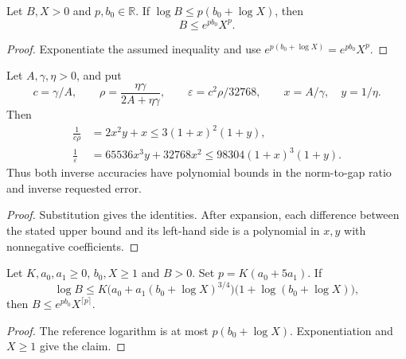 \begin{lemma}
    \label{lem:le_exp_mul_rpow_of_log_le}
    \leanok
    Let $B,X>0$ and $p,b_0\in\mathbb R$. If
    $\log B\le p(b_0+\log X)$, then
    \[
        B\le e^{pb_0}X^p.
    \]
\end{lemma}
\begin{proof}\leanok
    Exponentiate the assumed inequality and use
    $e^{p(b_0+\log X)}=e^{pb_0}X^p$.
\end{proof}

\begin{lemma}
    \label{lem:refinement_cost_polynomial_bounds}
    \leanok
    Let $A,\gamma,\eta>0$, and put
    \[
        c=\gamma/A,\qquad \rho=\frac{\eta\gamma}{2A+\eta\gamma},
        \qquad \varepsilon=c^2\rho/32768,
        \qquad x=A/\gamma,\quad y=1/\eta.
    \]
    Then
    \begin{align*}
        \frac1{c\rho}       & =2x^2y+x
        \le3(1+x)^2(1+y),                         \\
        \frac1{\varepsilon} & =65536x^3y+32768x^2
        \le98304(1+x)^3(1+y).
    \end{align*}
    Thus both inverse accuracies have polynomial bounds in the
    norm-to-gap ratio and inverse requested error.
\end{lemma}
\begin{proof}\leanok
    Substitution gives the identities. After expansion, each difference
    between the stated upper bound and its left-hand side is a polynomial
    in $x,y$ with nonnegative coefficients.
\end{proof}


\begin{lemma}
    \label{lem:reference_bound_le_nat_power}
    \leanok
    Let $K,a_0,a_1\ge0$, $b_0,X\ge1$ and $B>0$. Set
    $p=K(a_0+5a_1)$. If
    \[
        \log B\le K\bigl(a_0+a_1(b_0+\log X)^{3/4}\bigr)
        \bigl(1+\log(b_0+\log X)\bigr),
    \]
    then $B\le e^{pb_0}X^{\lceil p\rceil}$.
\end{lemma}
\begin{proof}\leanok
    The reference logarithm is at most $p(b_0+\log X)$.
    Exponentiation and $X\ge1$ give the claim.
\end{proof}

